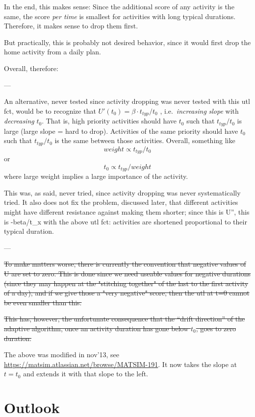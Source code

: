 In the end, this makes sense: Since the additional score of any activity is the same, the score \emph{per time} is smallest for activities with long typical durations. Therefore, it makes sense to drop them first.

But practically, this is probably not desired behavior, since it would first drop the home activity from a daily plan.

Overall, therefore: 

---

An  alternative, never tested since activity dropping was never  tested with  this utl fct, would be to recognize that $U'(t_0) = \beta \cdot  t_{typ} / t_0$ ,  i.e.\ \emph{increasing} \emph{slope} with \emph{decreasing}  $t_0$.  That is, high priority activities should have $t_0$ such that  $t_{typ}/t_0$ is  large (large slope = hard to drop). Activities of the  same priority  should have $t_0$ such that $t_{typ}/t_0$ is the same between  those activities.  Overall, something like
\[
weight \propto t_{typ}/t_0
\]
or
\[
t_0 \propto t_{typ}/weight
\]
where large weight implies a large importance of the activity.

This  was, as said, never tried, since activity dropping was never   systematically tried. It also does not fix the problem, discussed   later, that different activities might have different resistance  against  making them shorter; since this is U'', this is -beta/t\_x  with the  above utl fct: activities are shortened proportional to their  typical  duration.

---

\st{To make matters worse, there is currently the  convention that  negative values of U are set to zero. This is done  since we need  useable values for negative durations (since they may  happen at the  "stitching together" of the last to the first activity of a  day), and  if we give those a "very negative" score, then the utl at t=0  cannot be  even smaller than this.}

\st{This has, however, the  unfortunate consequence that the ``drift  direction'' of the adaptive  algorithm, once an activity duration has  gone below $t_0$, goes to zero  duration.}

The above was modified in nov'13, see \url{https://matsim.atlassian.net/browse/MATSIM-191}.  It now takes the slope at $t=t_0$ and extends it with that slope to the left.

\section{Outlook}

